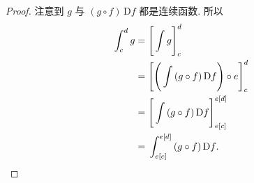 \begin{proof}
    注意到 $g$ 与 $(g \circ f)\,\mathrm{D}f$ 都是连续函数.
    所以
    \begin{align*}
        \int_{c}^{d} {g}
        = {} & \Bigg[ \int {g} \Bigg]_{c}^{d}                          \\
        = {} & \Bigg[ \Bigg( \int {(g \circ f)\,\mathrm{D}f} \Bigg)
        \circ e \Bigg]_{c}^{d}                                         \\
        = {} & \Bigg[ \int {(g \circ f)\,\mathrm{D}f} \Bigg]
        _{e[c]}^{e[d]}                                                 \\
        = {} & \int_{e[c]}^{e[d]} {(g \circ f)\,\mathrm{D}f}. \qedhere
    \end{align*}
\end{proof}

